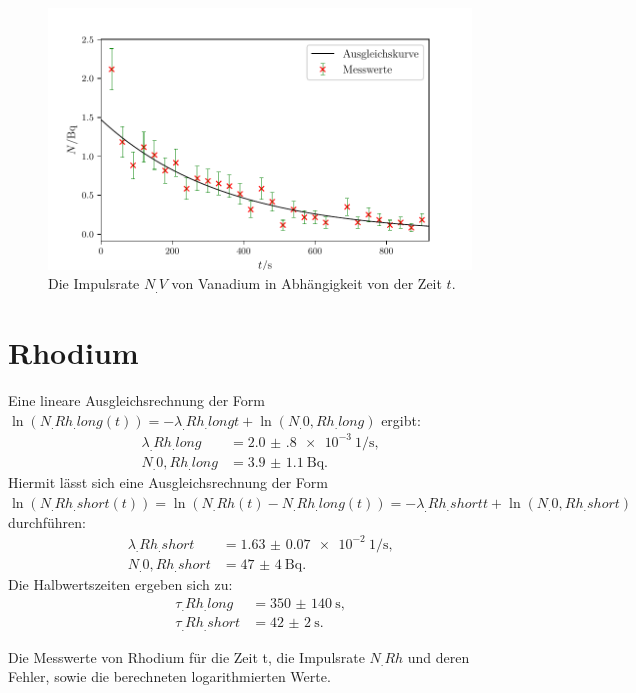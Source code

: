 \begin{figure}
	\centering
	\includegraphics[width=\linewidth-50pt,height=\textheight-50pt,keepaspectratio]{content/images/Vanadium.pdf}
	\caption{Die Impulsrate $N_.V$ von Vanadium in Abhängigkeit von der Zeit $t$.}
	\label{fig:Vanadium}
\end{figure}


\section{Rhodium}

Eine lineare Ausgleichsrechnung der Form $\ln(N_.{Rh_.{long}}(t))=-\lambda_.{Rh_.{long}} t+\ln(N_.{0,Rh_.{long}})$ ergibt:
\begin{align*}
\lambda_.{Rh_.{long}} 	&= \SI{2.0(8)e-3}{1\per\second}\text{,}\\
N_.{0,Rh_.{long}} 		&= \SI{3.9(11)}{\becquerel}\text{.}
\end{align*}
Hiermit lässt sich eine Ausgleichsrechnung der Form $\ln(N_.{Rh_.{short}}(t))=\ln(N_.{Rh}(t)-N_.{Rh_.{long}}(t))=-\lambda_.{Rh_.{short}} t+\ln(N_.{0,Rh_.{short}})$ durchführen:
\begin{align*}
\lambda_.{Rh_.{short}} 	&= \SI{1.63(7)e-2}{1\per\second}\text{,}\\
N_.{0,Rh_.{short}} 		&= \SI{47(4)}{\becquerel}\text{.}
\end{align*}
Die Halbwertszeiten ergeben sich zu:
\begin{align*}
\tau_.{Rh_.{long}} 	&= \SI{350(140)}{\second}\text{,}\\
\tau_.{Rh_.{short}} &= \SI{42(2)}{\second}\text{.}
\end{align*}

\begin{table}
	\centering
	\caption{Die Messwerte von Rhodium für die Zeit t, die Impulsrate $N_.{Rh}$ und deren Fehler, sowie die berechneten logarithmierten Werte.}
	
	\label{tab:tabRhodium1}
\end{table}

